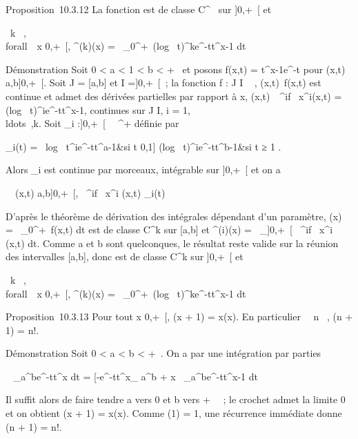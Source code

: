 \documentclass[]{article}
\begin{document}
Proposition~10.3.12 La fonction \Gamma est de classe C^\infty~ sur
{]}0,+\infty~{[} et

\forall~k \in {}~, \\forall~~x
\in{]}0,+\infty~{[}, \Gamma^(k)(x) =\int ~
\_0^+\infty~(log~
t)^ke^-tt^x-1 dt

Démonstration Soit 0 \textless{} a \textless{} 1 \textless{} b
\textless{} +\infty~ et posons f(x,t) = t^x-1e^-t pour
(x,t) \in {[}a,b{]}\times{]}0,+\infty~{[}. Soit J = {[}a,b{]} et I ={]}0,+\infty~{[}~; la
fonction f : J \times I \rightarrow~ , (x,t)\mapsto~f(x,t) est
continue et admet des dérivées partielles par rapport à x,
(x,t)\mapsto~\partial~^if\over
\partial~x^i(x,t) = (log~
t)^ie^-tt^x-1, continues sur J \times I, i =
1,\\ldots~,k. Soit
\phi\_i :{]}0,+\infty~{[}\rightarrow~ ~^+ définie par

 \phi\_i(t) = \left \
\cases \textbar{}log~
t\textbar{}^ie^-tt^a-1&si t \in{]}0,1{]}
\cr (log~
t)^ie^-tt^b-1&si t ≥ 1 
\right .

Alors \phi\_i est continue par morceaux, intégrable sur {]}0,+\infty~{[}
et on a

\forall~~(x,t) \in {[}a,b{]}\times{]}0,+\infty~{[}, \textbar{}
\partial~^if \over \partial~x^i (x,t)\textbar{}\leq
\phi\_i(t)

D'après le théorème de dérivation des intégrales dépendant d'un
paramètre, \Gamma(x) =\int ~
\_0^+\infty~f(x,t) dt est de classe C^k sur {[}a,b{]}
et \Gamma^(i)(x) =\int ~
\_{]}0,+\infty~{[} \partial~^if \over
\partial~x^i (x,t) dt. Comme a et b sont quelconques, le résultat
reste valide sur la réunion des intervalles {[}a,b{]}, donc \Gamma est de
classe C^k sur {]}0,+\infty~{[} et

\forall~k \in {}~, \\forall~~x
\in{]}0,+\infty~{[}, \Gamma^(k)(x) =\int ~
\_0^+\infty~(log~
t)^ke^-tt^x-1 dt

Proposition~10.3.13 Pour tout x \in{]}0,+\infty~{[}, \Gamma(x + 1) = x\Gamma(x). En
particulier \forall~~n \in \mathbb{N}~, \Gamma(n + 1) = n!.

Démonstration Soit 0 \textless{} a \textless{} b \textless{} +\infty~. On a
par une intégration par parties

\int ~
\_a^be^-tt^x dt =
\left
{[}-e^-tt^x\right {]}\_
a^b + x\int ~
\_a^be^-tt^x-1 dt

Il suffit alors de faire tendre a vers 0 et b vers + \infty~~; le crochet
admet la limite 0 et on obtient \Gamma(x + 1) = x\Gamma(x). Comme \Gamma(1) = 1, une
récurrence immédiate donne \Gamma(n + 1) = n!.
\end{document}
